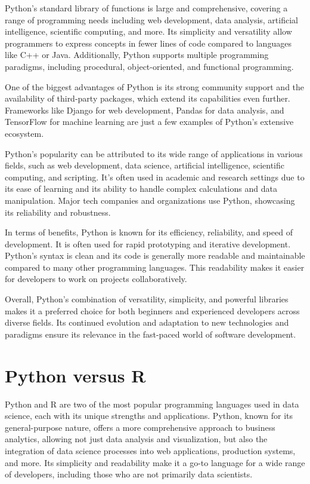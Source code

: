 Python's standard library of functions is large and comprehensive, covering a range of programming needs including web development, data analysis, artificial intelligence, scientific computing, and more. Its simplicity and versatility allow programmers to express concepts in fewer lines of code compared to languages like C++ or Java. Additionally, Python supports multiple programming paradigms, including procedural, object-oriented, and functional programming.

One of the biggest advantages of Python is its strong community support and the availability of third-party packages, which extend its capabilities even further. Frameworks like Django for web development, Pandas for data analysis, and TensorFlow for machine learning are just a few examples of Python's extensive ecosystem.

Python's popularity can be attributed to its wide range of applications in various fields, such as web development, data science, artificial intelligence, scientific computing, and scripting. It's often used in academic and research settings due to its ease of learning and its ability to handle complex calculations and data manipulation. Major tech companies and organizations use Python, showcasing its reliability and robustness.

In terms of benefits, Python is known for its efficiency, reliability, and speed of development. It is often used for rapid prototyping and iterative development. Python's syntax is clean and its code is generally more readable and maintainable compared to many other programming languages. This readability makes it easier for developers to work on projects collaboratively.

Overall, Python's combination of versatility, simplicity, and powerful libraries makes it a preferred choice for both beginners and experienced developers across diverse fields. Its continued evolution and adaptation to new technologies and paradigms ensure its relevance in the fast-paced world of software development.

\section{Python versus R}

Python and R are two of the most popular programming languages used in data science, each with its unique strengths and applications. Python, known for its general-purpose nature, offers a more comprehensive approach to business analytics, allowing not just data analysis and visualization, but also the integration of data science processes into web applications, production systems, and more. Its simplicity and readability make it a go-to language for a wide range of developers, including those who are not primarily data scientists.

